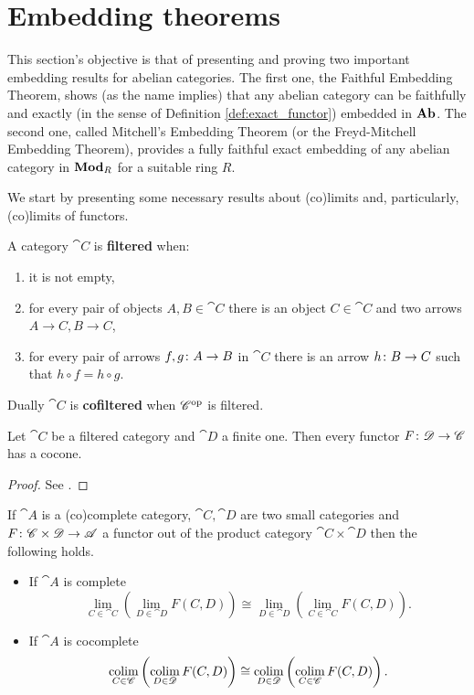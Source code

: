 \newpage
\section{Embedding theorems}
\label{sec:embedding}
This section's objective is that of presenting and proving two important embedding results for abelian categories. The first one, the Faithful Embedding Theorem, shows (as the name implies) that any abelian category can be faithfully and exactly (in the sense of Definition \ref{def:exact_functor}) embedded in \(\text{\normalfont\textbf{Ab}}\). The second one, called Mitchell's Embedding Theorem (or the Freyd-Mitchell Embedding Theorem), provides a fully faithful exact embedding of any abelian category in \(\text{\normalfont\textbf{Mod}}_R\) for a suitable ring \(R\).

We start by presenting some necessary results about (co)limits and, particularly, (co)limits of functors.

\begin{definition}
  \label{def:filtered_category}
  A category \(\cat{C}\) is {\bf filtered} when:
  \begin{enumerate}[label=(\arabic*)]
  \item it is not empty,
  \item for every pair of objects \(A,B\in\cat{C}\) there is an object \(C\in\cat{C}\) and two arrows \(A\to C, B\to C\),
  \item for every pair of arrows \(f,g\colon A\to B\) in \(\cat{C}\) there is an arrow \(h\colon B\to C\) such that \(h\circ f = h\circ g\).
  \end{enumerate}
  Dually \(\cat{C}\) is {\bf cofiltered} when \({\mathscr C}^{\text{op}}\) is filtered.
\end{definition}

\begin{lemma}
  \label{lemma:filtered_category}
  Let \(\cat{C}\) be a filtered category and \(\cat{D}\) a finite one.
  Then every functor \(F\colon {\mathscr D}\to {\mathscr C}\) has a cocone.
\end{lemma}

\begin{proof}
  See \cite[Lemma 2.13.2]{handbook1}.
\end{proof}

\begin{proposition}
  \label{prop:interchange_of_limits}
  If \(\cat{A}\) is a (co)complete category, \(\cat{C},\cat{D}\) are two small categories and \(F\colon {\mathscr C}\times{\mathscr D}\to {\mathscr A}\) a functor out of the product category \(\cat{C}\times\cat{D}\) then the following holds.
  \begin{itemize}
  \item If \(\cat{A}\) is complete
    \[\lim_{C\in\cat{C}}\left(\lim_{D\in\cat{D}}F(C, D)\right) \cong \lim_{D\in\cat{D}}\left(\lim_{C\in\cat{C}}F(C, D)\right).\]
  \item If \(\cat{A}\) is cocomplete
    \[\operatorname*{colim}_{C\in{\mathscr C}}\left(\operatorname*{colim}_{D\in{\mathscr D}}F(C, D)\right) \cong \operatorname*{colim}_{D\in{\mathscr D}}\left(\operatorname*{colim}_{C\in{\mathscr C}}F(C, D)\right).\]
  \end{itemize}
\end{proposition}

